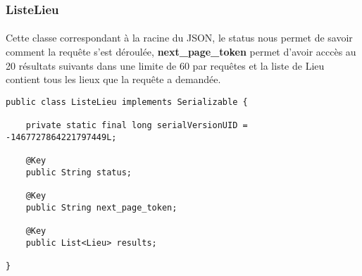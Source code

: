 \begin{onehalfspace}
\subsubsection*{ListeLieu}
\paragraph{}
Cette classe correspondant à la racine du JSON, le status nous permet de savoir comment la requête s'est déroulée, \textbf{next\_page\_token} permet d'avoir acccès au 20 résultats suivants dans une limite de 60 par requêtes et la liste de Lieu contient tous les lieux que la requête a demandée.
\\
\end{onehalfspace}
\begin{lstlisting}
public class ListeLieu implements Serializable {
 
    private static final long serialVersionUID = -1467727864221797449L;

    @Key
    public String status;
	
    @Key
    public String next_page_token;
 
    @Key
    public List<Lieu> results;
 
}
\end{lstlisting}
